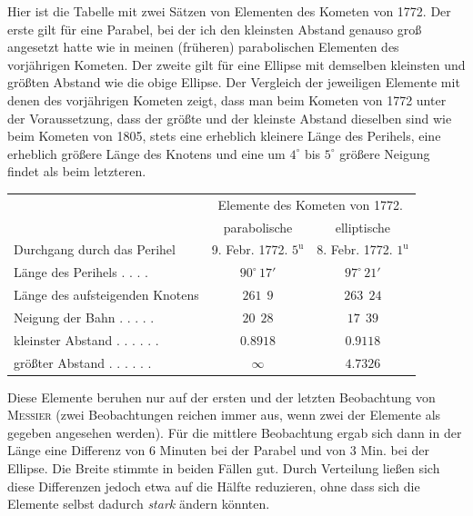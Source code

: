 \par\indent Hier ist die Tabelle mit zwei Sätzen von Elementen des Kometen von 1772. Der erste gilt für eine Parabel, bei der ich den kleinsten Abstand genauso groß angesetzt hatte wie in meinen (früheren) parabolischen Elementen des vorjährigen Kometen. Der zweite gilt für eine Ellipse mit demselben kleinsten und größten Abstand wie die obige Ellipse. Der Vergleich der jeweiligen Elemente mit denen des vorjährigen Kometen zeigt, dass man beim Kometen von 1772 unter der Voraussetzung, dass der größte und der kleinste Abstand dieselben sind wie beim Kometen von 1805, stets eine erheblich kleinere Länge des Perihels, eine erheblich größere Länge des Knotens und eine um $4^\circ$ bis $5^\circ$ größere Neigung findet als beim letzteren.

\begin{center}\begingroup
\fontsize{8}{10}\selectfont
\setlength{\tabcolsep}{2pt}\renewcommand{\arraystretch}{1.12}
\begin{tabular}{l|c|c}
& \multicolumn{2}{c}{Elemente des Kometen von 1772.} \\
 & parabolische & elliptische \\
\hline
Durchgang durch das Perihel & 9. Febr. 1772. $5^{\mathrm{u}}$ & 8. Febr. 1772. $1^{\mathrm{u}}$ \\
Länge des Perihels . . . . & $90^{\circ}\,17'$ & $97^{\circ}\,21'$ \\
Länge des aufsteigenden Knotens & $261\ \ 9$ & $263\ \ 24$ \\
Neigung der Bahn . . . . . & $20\ \ 28$ & $17\ \ 39$ \\
kleinster Abstand . . . . . . & $0.8918$ & $0.9118$ \\
größter Abstand . . . . . . & $\infty$ & $4.7326$ \\
\end{tabular}\endgroup\end{center}

\par\indent Diese Elemente beruhen nur auf der ersten und der letzten Beobachtung von \textsc{Messier} (zwei Beobachtungen reichen immer aus, wenn zwei der Elemente als gegeben angesehen werden). Für die mittlere Beobachtung ergab sich dann in der Länge eine Differenz von 6 Minuten bei der Parabel und von 3 Min. bei der Ellipse. Die Breite stimmte in beiden Fällen gut. Durch Verteilung ließen sich diese Differenzen jedoch etwa auf die Hälfte reduzieren, ohne dass sich die Elemente selbst dadurch \emph{stark} ändern könnten.

